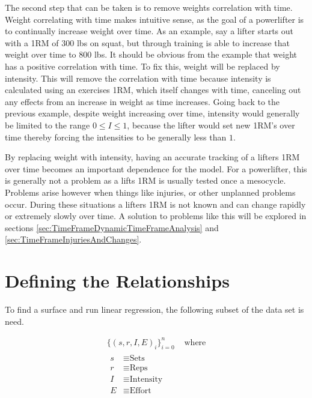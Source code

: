 The second step that can be taken is to remove weights correlation with time. Weight correlating with time makes intuitive sense, as the goal of a powerlifter is to continually increase weight over time. As an example, say a lifter starts out with a 1RM of $300$ lbs on squat, but through training is able to increase that weight over time to $800$ lbs. It should be obvious from the example that weight has a positive correlation with time. To fix this, weight will be replaced by intensity. This will remove the correlation with time because intensity is calculated using an exercises 1RM, which itself changes with time, canceling out any effects from an increase in weight as time increases. Going back to the previous example, despite weight increasing over time, intensity would generally be limited to the range $0\le I\le 1$, because the lifter would set new 1RM's over time thereby forcing the intensities to be generally less than $1$.

By replacing weight with intensity, having an accurate tracking of a lifters 1RM over time becomes an important dependence for the model. For a powerlifter, this is generally not a problem as a lifts 1RM is usually tested once a mesocycle. Problems arise however when things like injuries, or other unplanned problems occur. During these situations a lifters 1RM is not known and can change rapidly or extremely slowly over time. A solution to problems like this will be explored in sections \ref{sec:TimeFrameDynamicTimeFrameAnalysis} and \ref{sec:TimeFrameInjuriesAndChanges}.

\section{Defining the Relationships}
\label{sec:PotentialSurfaceDefiningTheRelationships}

To find a surface and run linear regression, the following subset of the data set is need.

\begin{equation}
    \label{eq:UserDataSet}
    \begin{split}
        \{(s,r,I,E)_i\}_{i=0}^n & \text{  where}\\
        \begin{split}
            s&\equiv \text{Sets} \\
            r&\equiv \text{Reps} \\
            I&\equiv \text{Intensity} \\
            E&\equiv \text{Effort} \\
        \end{split}
    \end{split}
\end{equation}

